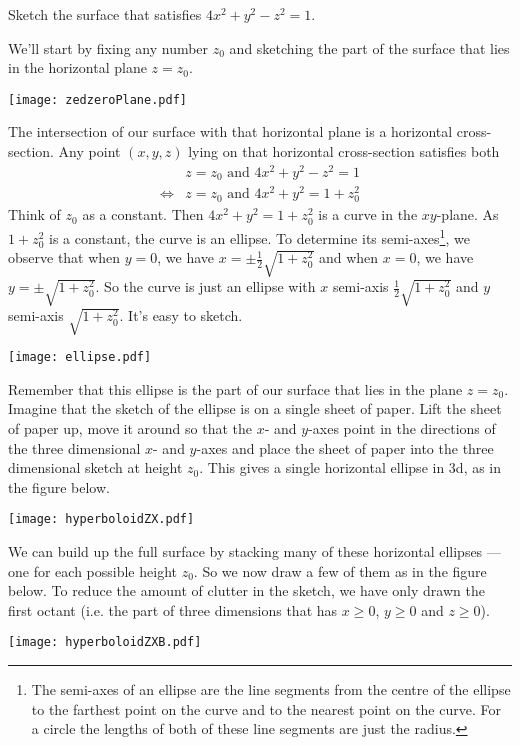 \bigskip
\begin{eg}[$4x^2+y^2-z^2=1$]\label{eg hyperboloid}
\medskip
Sketch the surface that satisfies $4x^2+y^2-z^2=1$.

\soln We'll start by fixing any number $z_0$ and sketching the part of
the surface that lies in the horizontal plane $z=z_0$. 
\begin{efig}
\begin{center}
   \texttt{[image: zedzeroPlane.pdf]}
\end{center}
\end{efig}
The intersection of our surface with that horizontal plane is a horizontal
cross-section. Any point $(x,y,z)$ lying on that horizontal cross-section
satisfies both 
\begin{align*}
&z=z_0\text{\ \ and\ \ }4x^2+y^2-z^2=1 \\
\iff
&z=z_0\text{\  \ and\ \ }4x^2+y^2=1+z_0^2
\end{align*}
Think of $z_0$ as a constant.
Then $4x^2+y^2=1+z_0^2$ is a curve in the $xy$-plane. As $1+z_0^2$ is a constant, the curve is an ellipse. To determine its semi-axes\footnote{The
semi-axes of an ellipse are the line segments from the centre of the ellipse
to the farthest point on the curve and to the nearest point on the curve.
For a circle the lengths of both of these line segments are just the  radius.}, we observe that
when $y=0$, we have $x=\pm\frac{1}{2}\sqrt{1+z_0^2}$ and when $x=0$,
we have $y=\pm\sqrt{1+z_0^2}$. So the curve is just an ellipse with 
$x$ semi-axis $\frac{1}{2}\sqrt{1+z_0^2}$ and $y$ semi-axis 
$\sqrt{1+z_0^2}$. It's easy to sketch.
\begin{efig}
\begin{center}
   \texttt{[image: ellipse.pdf]}
\end{center}
\end{efig}
Remember that this ellipse is the part of our surface that lies in the
plane $z=z_0$. Imagine that the sketch of the ellipse is on a single
sheet of paper. Lift the sheet of paper up, move it around so that 
the $x$- and $y$-axes point in the directions of the three dimensional 
$x$- and $y$-axes and place the sheet of paper into the three 
dimensional sketch at height $z_0$.
This gives a single horizontal ellipse in 3d, as in the figure below.
\begin{efig}
\begin{center}
   \texttt{[image: hyperboloidZX.pdf]}
\end{center}
\end{efig}
We can build up the full surface by stacking many of these horizontal 
ellipses --- one for each possible height $z_0$. 
So we now draw a few of them as in the figure below. To reduce the 
amount of clutter in the sketch, we have only drawn the first octant 
(i.e. the part of three dimensions that has $x\ge 0$, $y\ge 0$ and $z\ge 0$). 
\begin{efig}
\begin{center}
   \texttt{[image: hyperboloidZXB.pdf]}
\end{center}
\end{efig}


\end{eg}
